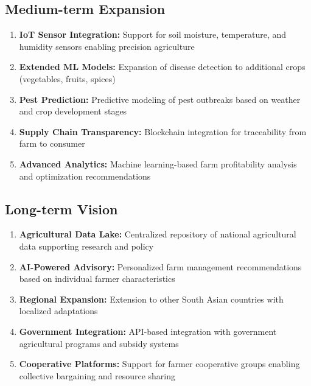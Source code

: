\documentclass[12pt,a4paper]{report}
\begin{document}
\subsection{Medium-term Expansion}

\begin{enumerate}
    \item \textbf{IoT Sensor Integration:} Support for soil moisture, temperature, and humidity sensors enabling precision agriculture
    
    \item \textbf{Extended ML Models:} Expansion of disease detection to additional crops (vegetables, fruits, spices)
    
    \item \textbf{Pest Prediction:} Predictive modeling of pest outbreaks based on weather and crop development stages
    
    \item \textbf{Supply Chain Transparency:} Blockchain integration for traceability from farm to consumer
    
    \item \textbf{Advanced Analytics:} Machine learning-based farm profitability analysis and optimization recommendations
\end{enumerate}

\subsection{Long-term Vision}

\begin{enumerate}
    \item \textbf{Agricultural Data Lake:} Centralized repository of national agricultural data supporting research and policy
    
    \item \textbf{AI-Powered Advisory:} Personalized farm management recommendations based on individual farmer characteristics
    
    \item \textbf{Regional Expansion:} Extension to other South Asian countries with localized adaptations
    
    \item \textbf{Government Integration:} API-based integration with government agricultural programs and subsidy systems
    
    \item \textbf{Cooperative Platforms:} Support for farmer cooperative groups enabling collective bargaining and resource sharing
\end{enumerate}
\end{document}
